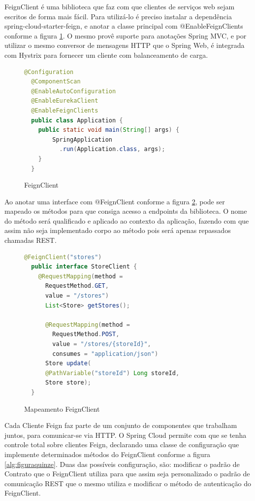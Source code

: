 \documentclass[journal]{IEEEtran}
\begin{document}
FeignClient é uma biblioteca que faz com que clientes de serviços web sejam escritos de forma mais fácil. Para utilizá-lo é preciso instalar a dependência spring-cloud-starter-feign, e anotar a classe principal com @EnableFeignClients conforme a figura \ref{alg:figuratreze}. O mesmo provê suporte para anotações Spring MVC, e por utilizar o mesmo conversor de mensagens HTTP que o Spring Web, é integrada com Hystrix para fornecer um cliente com balanceamento de carga.

\begin{figure}[h]
\centering

\begin{lstlisting}[language=Java]
  @Configuration
  @ComponentScan
  @EnableAutoConfiguration
  @EnableEurekaClient
  @EnableFeignClients
  public class Application {
    public static void main(String[] args) {
        SpringApplication
          .run(Application.class, args);
    }
  }
\end{lstlisting}

\caption{FeignClient}
\label{alg:figuratreze}
\end{figure}

Ao anotar uma interface com @FeignClient conforme a figura \ref{alg:figuraquartorze}, pode ser mapeado os métodos para que consiga acesso a endpoints da biblioteca. O nome do método será qualificado e aplicado ao contexto da aplicação, fazendo com que assim não seja implementado corpo ao método pois será apenas repassados chamadas REST.

\begin{figure}[h]
\centering

\begin{lstlisting}[language=Java]
  @FeignClient("stores")
  public interface StoreClient {
    @RequestMapping(method = 
      RequestMethod.GET, 
      value = "/stores")
      List<Store> getStores();

      @RequestMapping(method = 
        RequestMethod.POST, 
        value = "/stores/{storeId}", 
        consumes = "application/json")
      Store update(
      @PathVariable("storeId") Long storeId, 
      Store store);
  }
\end{lstlisting}

\caption{Mapeamento FeignClient}
\label{alg:figuraquartorze}
\end{figure}

Cada Cliente Feign faz parte de um conjunto de componentes que trabalham juntos, para comunicar-se via HTTP. O Spring Cloud permite com que se tenha controle total sobre clientes Feign, declarando uma classe de configuração que implemente determinados métodos do FeignClient conforme a figura \ref{alg:figuraquinze}. Duas das possíveis configuração, são: modificar o padrão de Contrato que o FeignClient utiliza para que assim seja personalizado o padrão de comunicação REST que o mesmo utiliza e modificar o método de autenticação do FeignClient.
\end{document}
